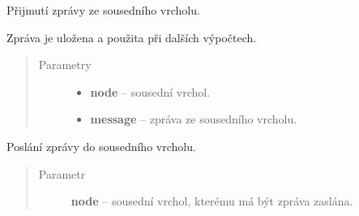 \begin{fulllineitems}
\begin{fulllineitems}
\end{fulllineitems}


\begin{fulllineitems}
\label{alex.infer:alex.infer.factor.alex.infer.node.DirichletParameterNode.message_from}
Přijmutí zprávy ze sousedního vrcholu.

Zpráva je uložena a použita při dalších výpočtech.
\begin{quote}\begin{description}
\item[{Parametry}] \leavevmode\begin{itemize}
\item {} 
\textbf{node} -- sousední vrchol.

\item {} 
\textbf{message} -- zpráva ze sousedního vrcholu.

\end{itemize}

\end{description}\end{quote}

\end{fulllineitems}


\begin{fulllineitems}
\label{alex.infer:alex.infer.factor.alex.infer.node.DirichletParameterNode.message_to}
Poslání zprávy do sousedního vrcholu.
\begin{quote}\begin{description}
\item[{Parametr}] \leavevmode
\textbf{node} -- sousední vrchol, kterému má být zpráva zaslána.

\end{description}\end{quote}

\end{fulllineitems}


\end{fulllineitems}

